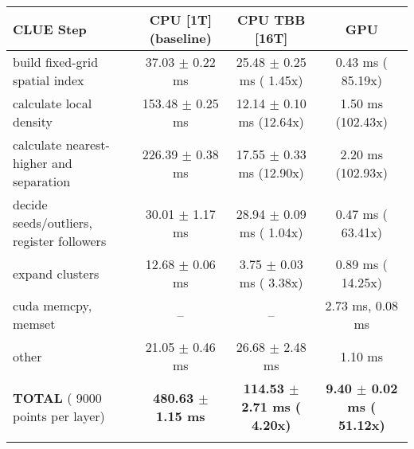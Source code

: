     \begin{tabular}{l|c|c|c}
    \hline
    CLUE Step                                 & CPU [1T] (baseline)         & CPU TBB [16T]                         & GPU                       \\ \hline
    build fixed-grid spatial index            &  37.03 $\pm$  0.22 ms       &  25.48 $\pm$  0.25 ms ( 1.45x)        &   0.43 ms ( 85.19x)       \\
    calculate local density                   & 153.48 $\pm$  0.25 ms       &  12.14 $\pm$  0.10 ms (12.64x)        &   1.50 ms (102.43x)       \\
    calculate nearest-higher and separation   & 226.39 $\pm$  0.38 ms       &  17.55 $\pm$  0.33 ms (12.90x)        &   2.20 ms (102.93x)       \\
    decide seeds/outliers, register followers &  30.01 $\pm$  1.17 ms       &  28.94 $\pm$  0.09 ms ( 1.04x)        &   0.47 ms ( 63.41x)       \\
    expand clusters                           &  12.68 $\pm$  0.06 ms       &   3.75 $\pm$  0.03 ms ( 3.38x)        &   0.89 ms ( 14.25x)       \\ \hline
    cuda memcpy, memset                       & --                          & --                                    &   2.73 ms,   0.08 ms      \\ 
    other                                     &  21.05 $\pm$  0.46 ms       &  26.68 $\pm$  2.48 ms                 &   1.10 ms                 \\ \hline
    \textbf{TOTAL} ( 9000 points per layer)   & \textbf{480.63 $\pm$  1.15 ms} & \textbf{114.53 $\pm$  2.71 ms ( 4.20x)} & \textbf{  9.40 $\pm$  0.02 ms ( 51.12x)}  \\
    \hline
    \multicolumn{4}{c}{} 
    \end{tabular}
    \linebreak


